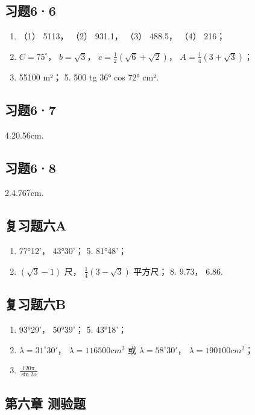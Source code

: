 \subsection{习题6·6}

\begin{enumerate}
\item
  （1） 5113， （2） 931.1， （3） 488.5， （4） 216；
\item
  \(C = 75^{\circ}\)， \(b = \sqrt{3}\)，
  \(c = \frac{1}{2} (\sqrt{6} + \sqrt{2})\)，
  \(A = \frac{1}{4} (3 + \sqrt{3})\)；
\item
  55100 m²； 5. 500 tg 36° cos 72° cm².
\end{enumerate}

\subsection{习题6·7}

4.20.56cm.

\subsection{习题6·8}

2.4.767cm.

\subsection{复习题六A}

\begin{enumerate}[start=4]
\item
  77°12'， 43°30'； 5. 81°48'；
\item
  \((\sqrt{3} - 1)\) 尺， \(\frac{1}{4} (3 - \sqrt{3})\) 平方尺； 8.
  9.73， 6.86.
\end{enumerate}

\subsection{复习题六B}

\begin{enumerate}[start=4]
\item
  93°29'， 50°39'； 5. 43°18'；
\item
  \(\lambda=31^{\circ}30'\)， \(\lambda=116500cm^{2}\) 或
  \(\lambda=58^{\circ}30'\)， \(\lambda=190100cm^{2}\)；
\item
  \(\frac{120\pi}{\sin 2\alpha}\)
\end{enumerate}

\subsection{第六章 测验题}

